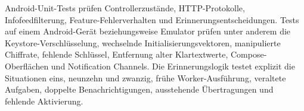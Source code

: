 Android-Unit-Tests prüfen Controllerzustände, HTTP-Protokolle, Infofeedfilterung, Feature-Fehlerverhalten und Erinnerungsentscheidungen. Tests auf einem Android-Gerät beziehungsweise Emulator prüfen unter anderem die Keystore-Verschlüsselung, wechselnde Initialisierungsvektoren, manipulierte Chiffrate, fehlende Schlüssel, Entfernung alter Klartextwerte, Compose-Oberflächen und Notification Channels. Die Erinnerungslogik testet explizit die Situationen eins, neunzehn und zwanzig, frühe Worker-Ausführung, veraltete Aufgaben, doppelte Benachrichtigungen, ausstehende Übertragungen und fehlende Aktivierung.
